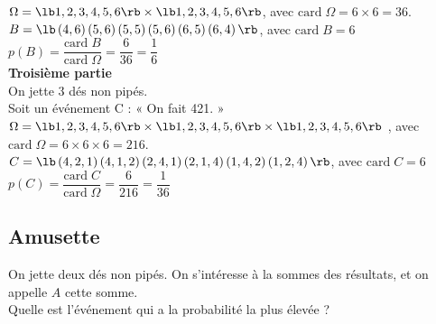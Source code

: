 $\Omega = \lb 1,2,3,4,5,6 \rb \times \lb 1,2,3,4,5,6 \rb$, avec $\mathrm{card} \; \Omega = 6 \times 6 = 36$. \\

$B = \lb \left(4,6\right) \left(5,6\right) \left(5,5\right) \left(5,6\right) \left(6,5\right) \left(6,4\right) \rb $, avec $\mathrm{card} \; B = 6 $ \\

$p\left(B\right) = \dfrac{\mathrm{card} \; B}{\mathrm{card} \; \Omega} = \dfrac{6}{36} = \dfrac{1}{6} $ \\

\textbf{Troisième partie} \\

On jette 3 dés non pipés. \\ Soit un événement C : « On fait 421. » \\

$\Omega = \lb 1,2,3,4,5,6 \rb \times \lb 1,2,3,4,5,6 \rb \times \lb 1,2,3,4,5,6 \rb$ , avec $\mathrm{card} \; \Omega = 6 \times 6 \times 6 = 216$. \\

$C = \lb \left(4,2,1\right) \left(4,1,2\right) \left(2,4,1\right) \left(2,1,4\right) \left(1,4,2\right) \left(1,2,4\right) \rb $, avec $\mathrm{card} \; C = 6 $ \\

$p\left(C\right) = \dfrac{\mathrm{card} \; C}{\mathrm{card} \; \Omega} = \dfrac{6}{216} = \dfrac{1}{36} $ \\

\newpage

\subsection{Amusette }

On jette deux dés non pipés. On s'intéresse à la sommes des résultats, et on appelle $A$ cette somme. \\ Quelle est l'événement qui a la probabilité la plus élevée ? \\

